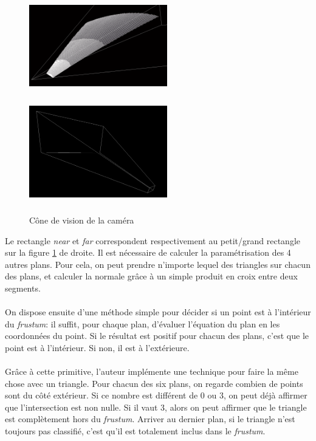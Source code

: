   \paragraph{}
  \begin{figure}[H]
  \centerline{
  \includegraphics[width=6cm,height=4.5cm]{img/culling.png}
  \includegraphics[width=6cm,height=4.5cm]{img/frustumbox.png}}
  \caption{Cône de vision de la caméra \protect\footnotemark}
  \label{fig:culling}
  \end{figure}
  Le rectangle \textit{near} et \textit{far} correspondent respectivement au petit/grand rectangle sur la figure \ref{fig:culling} de droite. 
  Il est nécessaire de calculer la paramétrisation des 4 autres plans. Pour cela, on peut prendre n'importe lequel des triangles sur chacun des plans, et calculer la normale grâce à un simple produit en croix entre deux segments.
  
  \paragraph{}
 
  On dispose ensuite d'une méthode simple pour décider si un point est à l'intérieur du \emph{frustum}: il suffit, pour chaque plan, d'évaluer l'équation du plan en les coordonnées du point. Si le résultat est positif pour chacun des plans, c'est que le point est à l'intérieur. Si non, il est à l'extérieure. 
  \paragraph{}
  Grâce à cette primitive, l'auteur implémente une technique pour faire la même chose avec un triangle. Pour chacun des six plans, on regarde combien de points sont du côté extérieur. Si ce nombre est différent de 0 ou 3, on peut déjà affirmer que l'intersection est non nulle. Si il vaut 3, alors on peut affirmer que le triangle est complètement hors du \emph{frustum}. Arriver au dernier plan, si le triangle n'est toujours pas classifié, c'est qu'il est totalement inclus dans le \emph{frustum}.
  
